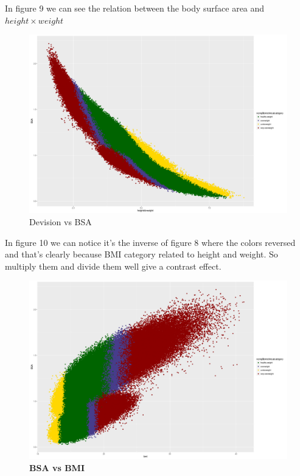 \documentclass{article}
\begin{document}
In figure 9 we can see the relation between the body surface area and \(height\times weight\)
	\begin{figure}[H]
		\begin{center}
			\includegraphics[scale=0.4]{divbsa.png}
		\end{center}
		\caption{Devision vs BSA}
	\end{figure}
	In figure 10 we can notice it's the inverse of figure 8 where the colors reversed and that's clearly because BMI category related to height and weight. So multiply them and divide them well give a contrast effect.
	\begin{figure}[H]
		\begin{center}
			\includegraphics[scale=0.4]{bsabmi.png}
		\end{center}
		\caption{\textbf{BSA vs BMI}}
	\end{figure}
\end{document}
